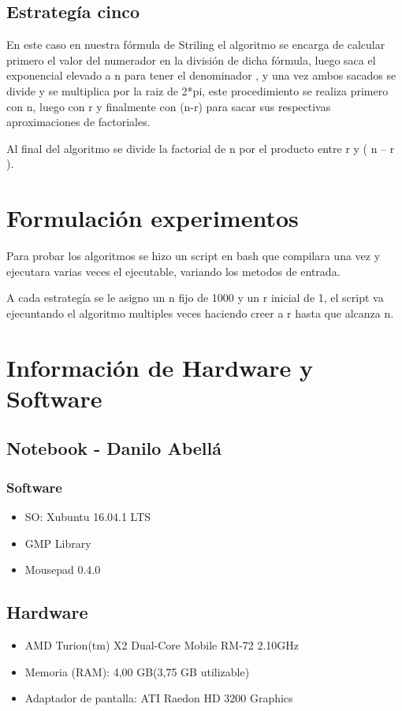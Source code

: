 \documentclass[12pt,letterpaper]{scrartcl}
\begin{document}
\subsection{Estrategía cinco}

En este caso en nuestra fórmula de Striling el algoritmo se encarga de calcular primero el valor del numerador en la división de dicha fórmula, luego saca el exponencial elevado a n para tener el denominador , y una vez ambos sacados se divide y se multiplica por la raiz de 2*pi, este procedimiento se realiza primero con n, luego con r y finalmente con (n-r) para sacar sus respectivas aproximaciones de factoriales.  

Al final del algoritmo se divide la factorial de n por el producto entre r y ( n – r ).



\section{Formulación experimentos}

Para probar los algoritmos se hizo un script en bash que compilara una vez y ejecutara varias veces el ejecutable, variando los metodos de entrada. 

A cada estrategía se le asigno un n fijo de 1000 y un r inicial de 1, el script va ejecuntando el algoritmo multiples veces haciendo creer a r hasta que alcanza n.

\section{Información de Hardware y Software}


\subsection{ Notebook - Danilo Abellá}
\subsubsection{Software}
\begin{itemize}
\item SO: Xubuntu 16.04.1 LTS
\item GMP Library
\item Mousepad 0.4.0
\end{itemize}

\subsection{Hardware}
\begin{itemize}
\item AMD Turion(tm) X2 Dual-Core Mobile RM-72 2.10GHz
\item Memoria (RAM): 4,00 GB(3,75 GB utilizable)
\item Adaptador de pantalla: ATI Raedon HD 3200 Graphics
\end{itemize}
\end{document}
